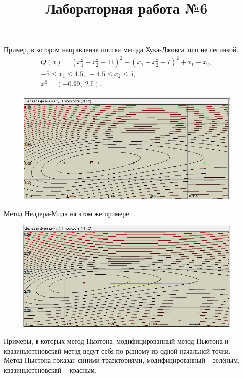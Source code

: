 \documentclass[12pt,a4paper]{article}
\begin{document}
\title{\textbf{Лабораторная работа №6}}
\author{}
\date{}
\maketitle

Пример, в котором направление поиска метода Хука-Дживса шло не лесинкой.
\begin{gather*}
    Q(x) = (x_1^2+x_2^2-11)^2 + (x_1+x_2^2-7)^2+x_1-x_2,\\
    -5 \le x_1 \le 4.5, \; -4.5 \le x_2 \le 5,\\
    x^0=(-0.09, \; 2.9).
\end{gather*}

\begin{figure}[H]
    \centering
    \includegraphics{hj.png}
\end{figure}

Метод Нелдера-Мида на этом же примере.

\begin{figure}[H]
    \centering
    \includegraphics{nm.png}
\end{figure}

Примеры, в которых метод Ньютона, модифицированный метод Ньютона и квазиньютоновский метод ведут себя по разному из одной начальной точки. Метод Ньютона показан синими траекториями, модифицированный -- зелёным, квазиньютоновский -- красным.
\end{document}
